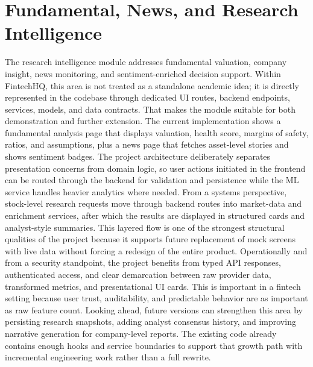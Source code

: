 \documentclass[11pt,a4paper]{article}
\begin{document}
\section{Fundamental, News, and Research Intelligence}
The research intelligence module addresses fundamental valuation, company insight, news monitoring, and sentiment-enriched decision support. Within FintechHQ, this area is not treated as a standalone academic idea; it is directly represented in the codebase through dedicated UI routes, backend endpoints, services, models, and data contracts. That makes the module suitable for both demonstration and further extension. The current implementation shows a fundamental analysis page that displays valuation, health score, margins of safety, ratios, and assumptions, plus a news page that fetches asset-level stories and shows sentiment badges. The project architecture deliberately separates presentation concerns from domain logic, so user actions initiated in the frontend can be routed through the backend for validation and persistence while the ML service handles heavier analytics where needed. From a systems perspective, stock-level research requests move through backend routes into market-data and enrichment services, after which the results are displayed in structured cards and analyst-style summaries. This layered flow is one of the strongest structural qualities of the project because it supports future replacement of mock screens with live data without forcing a redesign of the entire product. Operationally and from a security standpoint, the project benefits from typed API responses, authenticated access, and clear demarcation between raw provider data, transformed metrics, and presentational UI cards. This is important in a fintech setting because user trust, auditability, and predictable behavior are as important as raw feature count. Looking ahead, future versions can strengthen this area by persisting research snapshots, adding analyst consensus history, and improving narrative generation for company-level reports. The existing code already contains enough hooks and service boundaries to support that growth path with incremental engineering work rather than a full rewrite.
\end{document}
